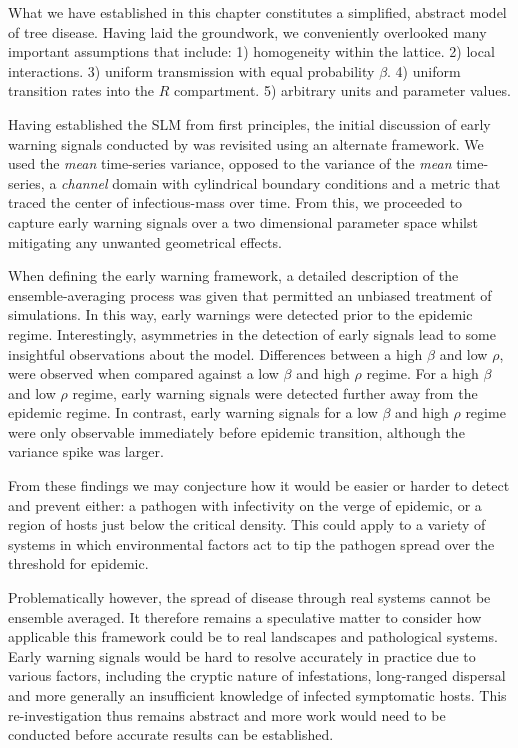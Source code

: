 What we have established in this chapter constitutes a simplified, abstract model of tree %
disease. Having laid the groundwork, we conveniently overlooked many important assumptions %
that include: 1) homogeneity within the lattice. 2) local interactions. 3) uniform %
transmission with equal probability $\beta$. 4) uniform transition rates into the $R$ compartment. %
5) arbitrary units and parameter values.  %

Having established the SLM from first principles, the initial discussion of early warning %
signals conducted by \cite{OROZCOFUENTES201912} was revisited using an alternate framework. %
% 
We used the \textit{mean} time-series variance, opposed to the variance of the \textit{mean} %
time-series, a \textit{channel} domain with cylindrical boundary conditions and a metric that %
traced the center of infectious-mass over time. From this, we proceeded to capture early warning %
signals over a two dimensional parameter space whilst mitigating any unwanted geometrical effects. %

When %
defining the early warning framework, a detailed description of the ensemble-averaging process %
was given that permitted an unbiased treatment of simulations. %
In this way, early warnings %
were detected prior to the epidemic regime. Interestingly, asymmetries %
in the detection of early %
 signals lead to some insightful observations about the model. %
 Differences between a high $\beta$ and low $\rho$, were observed when compared against a low $\beta$ %
 and high $\rho$ regime. For a high $\beta$ and low $\rho$ regime, early warning signals were detected %
 further away from the epidemic regime. %
 In contrast, early warning signals for a low $\beta$ and high $\rho$ regime were only %
 observable immediately before epidemic transition, although the variance spike was larger. %

From these findings we may conjecture how it would be easier or harder to detect and prevent %
either: a pathogen with infectivity on the verge of epidemic, or a region of hosts just below %
the critical density. %
This could apply to a variety of systems in which environmental factors act to tip the pathogen %
spread over the threshold for epidemic. %

Problematically however, the spread of disease through real systems cannot be ensemble averaged. %
It therefore remains a speculative matter to consider how applicable this framework could be to %
real landscapes and pathological systems. Early warning signals would be hard to resolve accurately in %
practice due to various factors, including the cryptic nature of infestations, %
long-ranged dispersal and more generally an insufficient knowledge of infected symptomatic hosts. %
This re-investigation thus remains abstract and more work would need to be conducted before %
accurate results can be established. %

\newpage